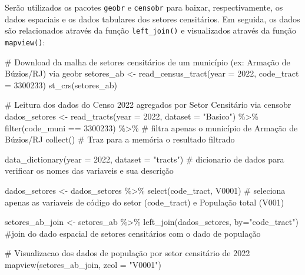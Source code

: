 \documentclass[
  letterpaper,
  DIV=11,
  numbers=noendperiod]{scrreprt}
\newenvironment{Shaded}{\begin{snugshade}}{\end{snugshade}}
\newcommand{\AttributeTok}[1]{\textcolor[rgb]{0.40,0.45,0.13}{#1}}
\newcommand{\CommentTok}[1]{\textcolor[rgb]{0.37,0.37,0.37}{#1}}
\newcommand{\DecValTok}[1]{\textcolor[rgb]{0.68,0.00,0.00}{#1}}
\newcommand{\FunctionTok}[1]{\textcolor[rgb]{0.28,0.35,0.67}{#1}}
\newcommand{\NormalTok}[1]{\textcolor[rgb]{0.00,0.23,0.31}{#1}}
\newcommand{\OtherTok}[1]{\textcolor[rgb]{0.00,0.23,0.31}{#1}}
\newcommand{\SpecialCharTok}[1]{\textcolor[rgb]{0.37,0.37,0.37}{#1}}
\newcommand{\StringTok}[1]{\textcolor[rgb]{0.13,0.47,0.30}{#1}}
\begin{document}
Serão utilizados os pacotes \texttt{geobr} e \texttt{censobr} para
baixar, respectivamente, os dados espaciais e os dados tabulares dos
setores censitários. Em seguida, os dados são relacionados através da
função \texttt{left\_join()} e visualizados através da função
\texttt{mapview()}:

\begin{Shaded}
\begin{Highlighting}[]
\CommentTok{\# Download da malha de setores censitários de um município (ex: Armação de Búzios/RJ) via geobr}
\NormalTok{setores\_ab }\OtherTok{\textless{}{-}} \FunctionTok{read\_census\_tract}\NormalTok{(}\AttributeTok{year =} \DecValTok{2022}\NormalTok{, }\AttributeTok{code\_tract =} \DecValTok{3300233}\NormalTok{)}
\FunctionTok{st\_crs}\NormalTok{(setores\_ab)}

\CommentTok{\# Leitura dos dados do Censo 2022 agregados por Setor Censitário via censobr}
\NormalTok{dados\_setores }\OtherTok{\textless{}{-}} \FunctionTok{read\_tracts}\NormalTok{(}\AttributeTok{year =} \DecValTok{2022}\NormalTok{, }\AttributeTok{dataset =} \StringTok{"Basico"}\NormalTok{) }\SpecialCharTok{\%\textgreater{}\%}
  \FunctionTok{filter}\NormalTok{(code\_muni }\SpecialCharTok{==} \DecValTok{3300233}\NormalTok{) }\SpecialCharTok{\%\textgreater{}\%} \CommentTok{\# filtra apenas o município de Armação de Búzios/RJ}
  \FunctionTok{collect}\NormalTok{() }\CommentTok{\# Traz para a memória o resultado filtrado}

\FunctionTok{data\_dictionary}\NormalTok{(}\AttributeTok{year =} \DecValTok{2022}\NormalTok{, }\AttributeTok{dataset =} \StringTok{"tracts"}\NormalTok{) }\CommentTok{\# dicionario de dados para verificar os nomes das variaveis e sua descrição}

\NormalTok{dados\_setores }\OtherTok{\textless{}{-}}\NormalTok{ dados\_setores }\SpecialCharTok{\%\textgreater{}\%}
  \FunctionTok{select}\NormalTok{(code\_tract, V0001) }\CommentTok{\# seleciona apenas as variaveis de código do setor (code\_tract) e População total (V001)}

\NormalTok{setores\_ab\_join }\OtherTok{\textless{}{-}}\NormalTok{ setores\_ab }\SpecialCharTok{\%\textgreater{}\%}
  \FunctionTok{left\_join}\NormalTok{(dados\_setores, }\AttributeTok{by=}\StringTok{"code\_tract"}\NormalTok{) }\CommentTok{\#join do dado espacial de setores censitários com o dado de população}

\CommentTok{\# Visualizacao dos dados de população por setor censitário de 2022}
\FunctionTok{mapview}\NormalTok{(setores\_ab\_join, }\AttributeTok{zcol =} \StringTok{"V0001"}\NormalTok{)}
\end{Highlighting}
\end{Shaded}
\end{document}
